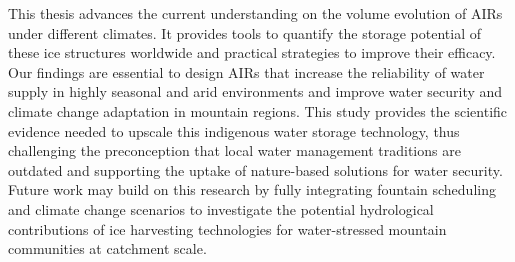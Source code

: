 This thesis advances the current understanding on the volume evolution of AIRs under different climates. It
provides tools to quantify the storage potential of these ice structures worldwide and practical strategies to
improve their efficacy. Our findings are essential to design AIRs that increase the reliability of water supply
in highly seasonal and arid environments and improve water security and climate change adaptation in mountain
regions. This study provides the scientific evidence needed to upscale this indigenous water storage technology,
thus challenging the preconception that local water management traditions are outdated and supporting the uptake
of nature-based solutions for water security. Future work may build on this research by fully integrating
fountain scheduling and climate change scenarios to investigate the potential hydrological contributions of ice
harvesting technologies for water-stressed mountain communities at catchment scale.
